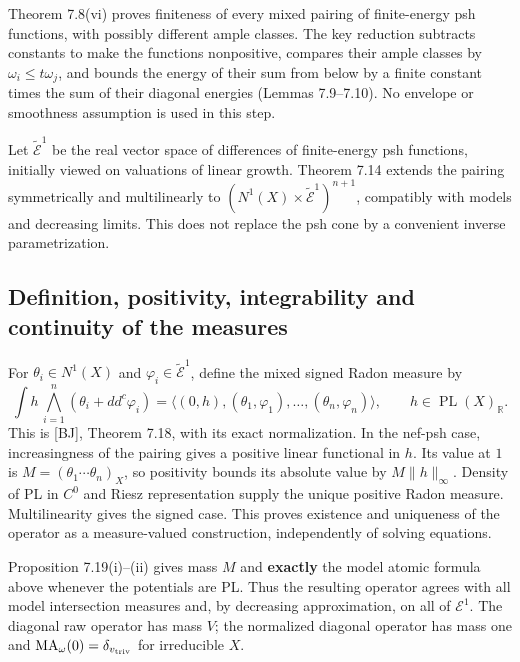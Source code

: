 \documentclass[11pt]{article}
\begin{document}
Theorem 7.8(vi) proves finiteness of every mixed pairing of
finite-energy psh functions, with possibly different ample classes. The
key reduction subtracts constants to make the functions nonpositive,
compares their ample classes by \(\omega_i\leq t\omega_j\), and bounds
the energy of their sum from below by a finite constant times the sum of
their diagonal energies (Lemmas 7.9--7.10). No envelope or smoothness
assumption is used in this step.

Let \(\widetilde{\mathcal E}^1\) be the real vector space of differences
of finite-energy psh functions, initially viewed on valuations of linear
growth. Theorem 7.14 extends the pairing symmetrically and multilinearly
to \((N^1(X)\times\widetilde{\mathcal E}^1)^{n+1}\), compatibly with
models and decreasing limits. This does not replace the psh cone by a
convenient inverse parametrization.

\subsection{Definition, positivity, integrability and continuity of the
measures}\label{definition-positivity-integrability-and-continuity-of-the-measures}

For \(\theta_i\in N^1(X)\) and \(\varphi_i\in\widetilde{\mathcal E}^1\),
define the mixed signed Radon measure by
\[\int h\,\bigwedge_{i=1}^n(\theta_i+dd^c\varphi_i)
=\langle(0,h),(\theta_1,\varphi_1),\ldots,(\theta_n,\varphi_n)\rangle,
\qquad h\in\operatorname{PL}(X)_{\mathbb R}.\] This is {[}BJ{]}, Theorem
7.18, with its exact normalization. In the nef-psh case, increasingness
of the pairing gives a positive linear functional in \(h\). Its value at
\(1\) is \(M=(\theta_1\cdots\theta_n)_X\), so positivity bounds its
absolute value by \(M\|h\|_\infty\). Density of PL in \(C^0\) and Riesz
representation supply the unique positive Radon measure. Multilinearity
gives the signed case. This proves existence and uniqueness of the
operator as a measure-valued construction, independently of solving
equations.

Proposition 7.19(i)--(ii) gives mass \(M\) and \textbf{exactly} the
model atomic formula above whenever the potentials are PL. Thus the
resulting operator agrees with all model intersection measures and, by
decreasing approximation, on all of \(\mathcal E^1\). The diagonal raw
operator has mass \(V\); the normalized diagonal operator has mass one
and \(\operatorname{MA}_\omega(0)=\delta_{v_{\rm triv}}\) for
irreducible \(X\).
\end{document}
